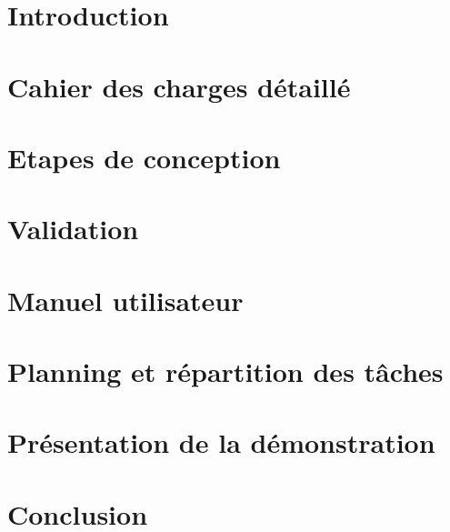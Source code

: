 
\section{Introduction}


\section{Cahier des charges détaillé}


\section{Etapes de conception}


\section{Validation}


\section{Manuel utilisateur}


\section{Planning et répartition des tâches}


\section{Présentation de la démonstration}


\section{Conclusion}


\pagebreak


\pagebreak



\pagebreak
\printnomenclature

